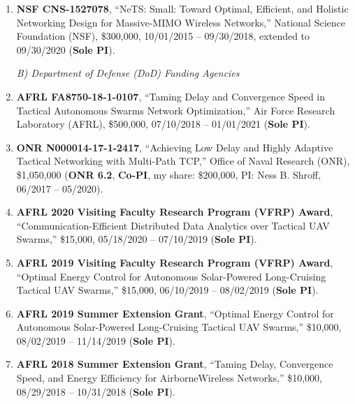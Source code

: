 \documentclass[overlapped,line,letterpaper]{res1}
\begin{document}
\begin{resume}
\begin{enumerate}
\vspace*{.08in} \item {\bf NSF CNS-1527078}, ``NeTS: Small: Toward Optimal, Efficient, and Holistic Networking Design for Massive-MIMO Wireless Networks,'' National Science Foundation (NSF), \$300,000, 10/01/2015 -- 09/30/2018, extended to 09/30/2020 ({\bf Sole PI}).

\vspace*{.08in}
\hspace{-.55in}  {\em B) Department of Defense (DoD) Funding Agencies}

\vspace*{.08in} \item {\bf AFRL FA8750-18-1-0107}, ``Taming Delay and Convergence Speed in Tactical Autonomous Swarms Network Optimization,'' Air Force Research Laboratory (AFRL), \$500,000, 07/10/2018 -- 01/01/2021 ({\bf Sole PI}).


\vspace*{.08in} \item {\bf ONR N000014-17-1-2417}, ``Achieving Low Delay and Highly Adaptive Tactical Networking with Multi-Path TCP,'' Office of Naval Research (ONR), \$1,050,000 ({\bf ONR 6.2}, {\bf Co-PI}, my share: \$200,000, PI: Ness B. Shroff, 06/2017 -- 05/2020).

\vspace*{.08in} \item {\bf AFRL 2020 Visiting Faculty Research Program (VFRP) Award}, ``Communication-Efficient Distributed Data Analytics over Tactical UAV Swarms,''  \$15,000, 05/18/2020 -- 07/10/2019 ({\bf Sole PI}).

\vspace*{.08in} \item {\bf AFRL 2019 Visiting Faculty Research Program (VFRP) Award}, ``Optimal Energy Control for Autonomous Solar-Powered Long-Cruising Tactical UAV Swarms,''  \$15,000, 06/10/2019 -- 08/02/2019 ({\bf Sole PI}).

\vspace*{.08in} \item {\bf AFRL 2019 Summer Extension Grant}, ``Optimal Energy Control for Autonomous Solar-Powered Long-Cruising Tactical UAV Swarms,''  \$10,000, 08/02/2019 -- 11/14/2019 ({\bf Sole PI}).

\vspace*{.08in} \item {\bf AFRL 2018 Summer Extension Grant}, ``Taming Delay, Convergence Speed, and Energy Efficiency for AirborneWireless Networks,''  \$10,000, 08/29/2018 -- 10/31/2018 ({\bf Sole PI}).


\end{enumerate}
\end{resume}
\end{document}
